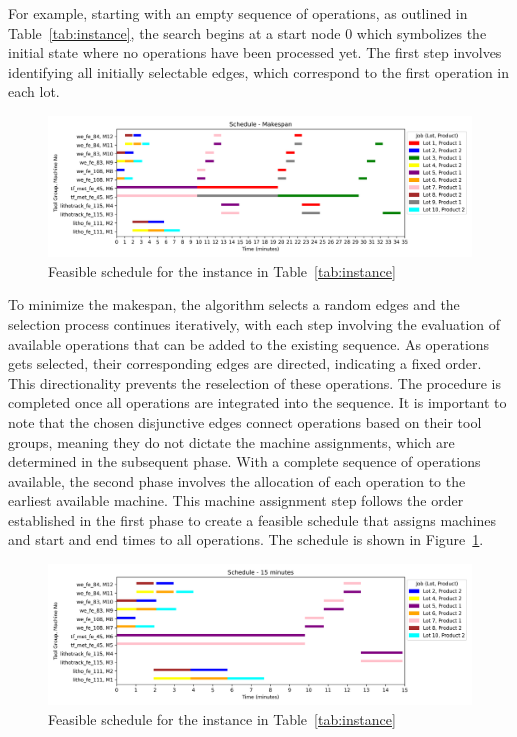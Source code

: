 For example, starting with an empty sequence of operations, as outlined in Table~\ref{tab:instance}, the search begins at a start node $0$ which symbolizes the initial state where no operations have been processed yet. The first step involves identifying all initially selectable edges, which correspond to the first operation in each lot.

\begin{figure}[t]
	\includegraphics[width=\textwidth]{schedule_example_makespan.png}
	\caption{Feasible schedule for the instance in Table~\ref{tab:instance}}
	\label{fig:sch-makespan}
\end{figure}


To minimize the makespan, the algorithm selects a random edges and the selection process continues iteratively, with each step involving the evaluation of available operations that can be added to the existing sequence.
As operations gets selected, their corresponding edges are directed, indicating a fixed order. This directionality prevents the reselection of these operations. The procedure is completed once all operations are integrated into the sequence.
It is important to note that the chosen disjunctive edges connect operations based on their tool groups, meaning they do not dictate the machine assignments, which are determined in the subsequent phase. With a complete sequence of operations available, the second phase involves the allocation of each operation to the earliest available machine. This machine assignment step follows the order established in the first phase to create a feasible schedule that assigns machines and start and end times to all operations. The schedule is shown in Figure~\ref{fig:sch-makespan}.

\begin{figure}[ht]
	\includegraphics[width=\textwidth]{schedule_example_operations.png}
	\caption{Feasible schedule for the instance in Table~\ref{tab:instance}}
	\label{fig:sch-operations}
\end{figure}

